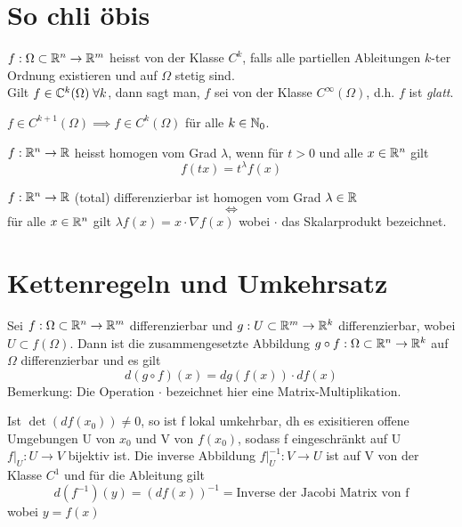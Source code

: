 \section{So chli öbis}

\begin{definition}
    $f: \Omega \subset \mathbb{R}^n \to \mathbb{R}^m$ heisst von der Klasse $C^k$, falls alle partiellen Ableitungen $k$-ter Ordnung existieren und auf $\Omega$ stetig sind.\\
    Gilt $f \in \mathbb{C}^k (\Omega) \; \forall k$, dann sagt man, $f$ sei von der Klasse $C^\infty(\Omega)$, d.h. $f$ ist \textit{glatt}.
\end{definition}

\begin{theorem}
    $f \in C^{k+1}(\Omega) \implies f \in C^k (\Omega)$ für alle $k \in \mathbb{N}_0 $.
\end{theorem}

\begin{definition}
    $f: \mathbb{R}^n \to \mathbb{R}$ heisst homogen vom Grad $\lambda$, wenn für $t>0$ und alle $x \in \mathbb{R}^n$ gilt
    $$ f(tx) = t^\lambda f(x)$$
\end{definition}

\begin{theorem}
    $f :\mathbb{R}^n \to \mathbb{R}$ (total) differenzierbar ist homogen vom Grad $\lambda \in \mathbb{R}$ $$ \iff$$
    für alle $x \in \mathbb{R}^n$ gilt $\displaystyle \lambda f(x) = x \cdot \nabla f(x)$ wobei $\cdot$ das Skalarprodukt bezeichnet.
\end{theorem}

\section{Kettenregeln und Umkehrsatz}

\begin{theorem}[Kettenregel]
    Sei $f: \Omega \subset \mathbb{R}^n \to \mathbb{R}^m$ differenzierbar und $g: U \subset \mathbb{R}^m \to \mathbb{R}^k$ differenzierbar, wobei $U \subset f(\Omega)$. Dann ist die zusammengesetzte Abbildung $g \circ f : \Omega \subset \mathbb{R}^n \to \mathbb{R}^k$ auf $\Omega$ differenzierbar und es gilt
$$ d (g \circ f)(x) = dg(f(x)) \cdot df(x)$$
Bemerkung: Die Operation $\cdot$ bezeichnet hier eine Matrix-Multiplikation.
\end{theorem}

\begin{theorem}[Umkehrsatz]
    Ist $\det(df(x_0)) \neq 0$, so ist f lokal umkehrbar, dh es exisitieren offene Umgebungen U von $x_0$ und V von $f(x_0)$, sodass f eingeschränkt auf U $f| _U: U \to V$ bijektiv ist. Die inverse Abbildung $f| _U^{-1}: V \to U$ ist auf V von der Klasse $C^1$ und für die Ableitung gilt $$d(f^{-1})(y) = (df(x))^{-1} = \mbox{Inverse der Jacobi Matrix von f}$$ wobei $y = f(x)$
\end{theorem}

